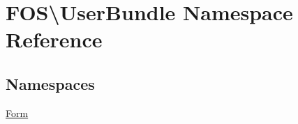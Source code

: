 \hypertarget{namespace_f_o_s_1_1_user_bundle}{\section{F\+O\+S\textbackslash{}User\+Bundle Namespace Reference}
\label{namespace_f_o_s_1_1_user_bundle}
}
\subsection*{Namespaces}
\begin{DoxyCompactItemize}
\item 
 \hyperlink{namespace_f_o_s_1_1_user_bundle_1_1_form}{Form}
\end{DoxyCompactItemize}
